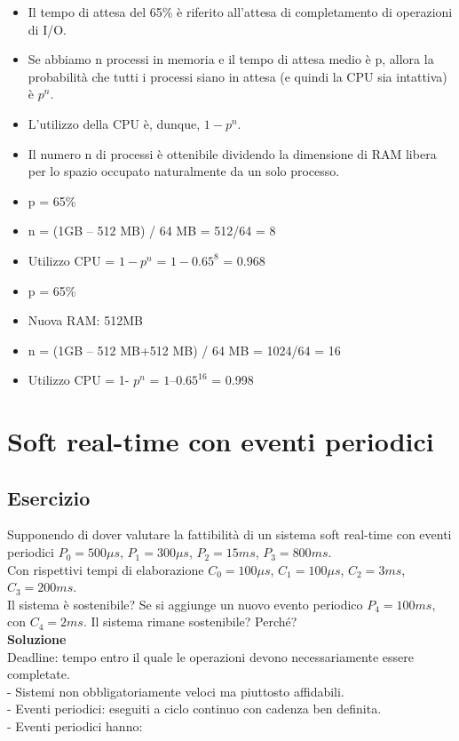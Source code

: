 \documentclass{article}
\begin{document}
\begin{itemize}
\item Il tempo di attesa del 65\% è riferito all'attesa di completamento di operazioni di I/O.
\item Se abbiamo n processi in memoria e il tempo di attesa medio è p, allora la probabilità che tutti i processi siano in attesa (e quindi la CPU sia intattiva) è $p^n$.
\item  L'utilizzo della CPU è, dunque, $1- p^n$.
\item  Il numero n di processi è ottenibile dividendo la dimensione di RAM libera per lo spazio occupato naturalmente da un solo processo.
\item  p = 65\% 
\item  n = (1GB – 512 MB) / 64 MB = 512/64 = 8 
\item  Utilizzo CPU = $1- p^n$ = $1 - 0.65^8$ = 0.968 
\item  p = 65\% 
\item  Nuova RAM: 512MB 
\item  n = (1GB – 512 MB+512 MB) / 64 MB = 1024/64 = 16 
\item  Utilizzo CPU = 1- $p^n$ = $1 – 0.65^{16}$ = 0.998 
\end{itemize}


\section{Soft real-time con eventi periodici}
\subsection{Esercizio}

Supponendo di dover valutare la fattibilità di un sistema soft real-time con eventi periodici $P_{0}=500 \mu s$, $P_{1}=300 \mu s$, $P_{2}=15 ms$, $P_{3} = 800 ms$.\\
Con rispettivi tempi di elaborazione $C_{0}=100 \mu s$, $C_{1}=100 \mu s$,
$C_{2}=3ms$, $C_{3}=200 ms$.\\
Il sistema è sostenibile? Se si aggiunge un nuovo evento periodico $P_4=100ms$, con $C_4= 2ms$. Il sistema rimane sostenibile? Perché?\\

\vskip 0.5cm
\textbf{Soluzione}\\

Deadline: tempo entro il quale le operazioni devono necessariamente
essere completate.\\
- Sistemi non obbligatoriamente veloci ma piuttosto affidabili.\\
- Eventi periodici: eseguiti a ciclo continuo con cadenza ben definita.\\
- Eventi periodici hanno:
\end{document}
